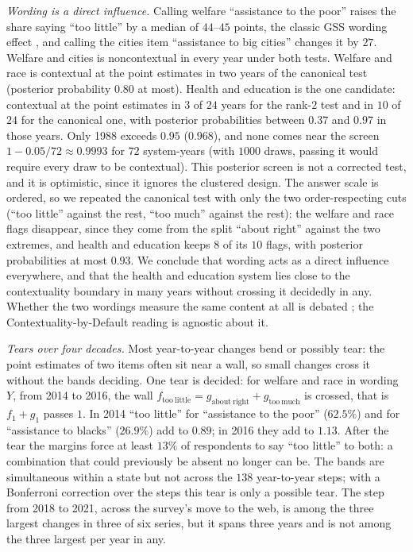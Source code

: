 \documentclass[11pt]{article}
\theoremstyle{definition}
\theoremstyle{remark}
\begin{document}
\emph{Wording is a direct influence.} Calling welfare ``assistance to the poor'' raises the share saying ``too little'' by a median of
$44$--$45$ points, the classic GSS wording effect \cite{Smith1987}, and calling the cities item ``assistance to big cities'' changes it by
$27$. Welfare and cities is noncontextual in every year under both tests. Welfare and race is contextual at the point estimates in two years
of the canonical test (posterior probability $0.80$ at most). Health and education is the one candidate: contextual at the point estimates
in $3$ of $24$ years for the rank-$2$ test and in $10$ of $24$ for the canonical one, with posterior probabilities between $0.37$ and
$0.97$ in those years. Only 1988 exceeds $0.95$ ($0.968$), and none comes near the screen $1-0.05/72\approx0.9993$ for $72$
system-years (with $1000$ draws, passing it would require every draw to be contextual). This posterior screen is not a corrected test,
and it is optimistic, since it ignores the clustered design. The answer scale is ordered, so we repeated the canonical test with only the
two order-respecting cuts (``too little'' against the rest, ``too much'' against the rest): the welfare and race flags disappear, since
they come from the split ``about right'' against the two extremes, and health and education keeps $8$ of its $10$ flags, with posterior
probabilities at most $0.93$. We conclude that wording acts as a direct influence everywhere, and that the health and education system lies
close to the contextuality boundary in many years without crossing it decidedly in any. Whether the two wordings measure the same content
at all is debated \cite{HuberParis2013}; the Contextuality-by-Default reading is agnostic about it.

\emph{Tears over four decades.} Most year-to-year changes bend or possibly tear: the point estimates of two items often sit near a wall, so
small changes cross it without the bands deciding. One tear is decided: for welfare and race in wording $Y$, from 2014 to 2016, the wall
$f_{\mathrm{too\ little}}=g_{\mathrm{about\ right}}+g_{\mathrm{too\ much}}$ is crossed, that is $f_1+g_1$ passes $1$. In 2014 ``too little'' for
``assistance to the poor'' ($62.5\%$) and for ``assistance to blacks'' ($26.9\%$) add to $0.89$; in 2016 they add to $1.13$. After the tear the
margins force at least $13\%$ of respondents to say ``too little'' to both: a combination that could previously be absent no longer can be.
The bands are simultaneous within a state but not across the $138$ year-to-year steps; with a Bonferroni correction over the steps this tear
is only a possible tear. The step from 2018 to 2021, across the survey's move to the web, is among the three largest changes in three of
six series, but it spans three years and is not among the three largest per year in any.
\end{document}
